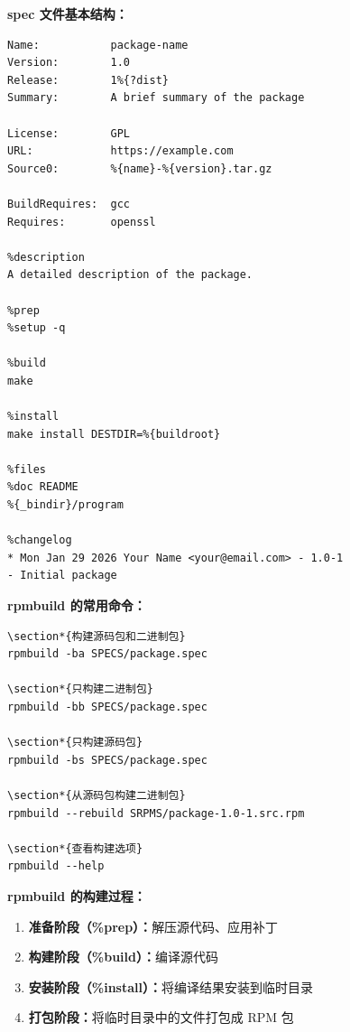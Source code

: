\documentclass[12pt,UTF8]{ctexbook}
\begin{document}
\textbf{spec 文件基本结构：}
\begin{verbatim}
Name:           package-name
Version:        1.0
Release:        1%{?dist}
Summary:        A brief summary of the package

License:        GPL
URL:            https://example.com
Source0:        %{name}-%{version}.tar.gz

BuildRequires:  gcc
Requires:       openssl

%description
A detailed description of the package.

%prep
%setup -q

%build
make

%install
make install DESTDIR=%{buildroot}

%files
%doc README
%{_bindir}/program

%changelog
* Mon Jan 29 2026 Your Name <your@email.com> - 1.0-1
- Initial package
\end{verbatim}

\textbf{rpmbuild 的常用命令：}
\begin{verbatim}
\section*{构建源码包和二进制包}
rpmbuild -ba SPECS/package.spec

\section*{只构建二进制包}
rpmbuild -bb SPECS/package.spec

\section*{只构建源码包}
rpmbuild -bs SPECS/package.spec

\section*{从源码包构建二进制包}
rpmbuild --rebuild SRPMS/package-1.0-1.src.rpm

\section*{查看构建选项}
rpmbuild --help
\end{verbatim}

\textbf{rpmbuild 的构建过程：}
\begin{enumerate}
    \item \textbf{准备阶段（\%prep）：}解压源代码、应用补丁
    \item \textbf{构建阶段（\%build）：}编译源代码
    \item \textbf{安装阶段（\%install）：}将编译结果安装到临时目录
    \item \textbf{打包阶段：}将临时目录中的文件打包成 RPM 包
\end{enumerate}
\end{document}
